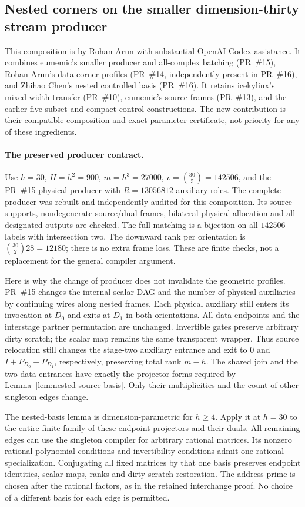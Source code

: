 \subsection{Nested corners on the smaller dimension-thirty stream producer}
\label{sec:stream-nested-composition}
This composition is by Rohan Arun with substantial OpenAI Codex assistance.
It combines eumemic's smaller producer and all-complex batching (PR~\#15),
Rohan Arun's data-corner profiles (PR~\#14, independently present in
PR~\#16), and Zhihao Chen's nested controlled basis (PR~\#16). It retains
icekylinx's mixed-width transfer (PR~\#10), eumemic's source frames
(PR~\#13), and the earlier five-subset and compact-control constructions.
The new contribution is their compatible composition and exact parameter
certificate, not priority for any of these ingredients.

\paragraph{The preserved producer contract.}
Use $h=30$, $H=h^2=900$, $m=h^3=27000$, $v=\binom{30}{5}=142506$,
and the PR~\#15 physical producer with $R=13056812$ auxiliary roles.
The complete producer was rebuilt and independently audited for this
composition. Its source supports, nondegenerate source/dual frames,
bilateral physical allocation and all designated outputs are checked.
The full matching is a bijection on all $142506$ labels with intersection
two. The downward rank per orientation is $\binom{30}{2}28=12180$;
there is no extra frame loss. These are finite checks, not a replacement
for the general compiler argument.

Here is why the change of producer does not invalidate the geometric
profiles. PR~\#15 changes the internal scalar DAG and the number of physical
auxiliaries by continuing wires along nested frames. Each physical
auxiliary still enters its invocation at $D_0$ and exits at $D_1$ in both
orientations. All data endpoints and the interstage partner permutation
are unchanged. Invertible gates preserve arbitrary dirty scratch; the
scalar map remains the same transparent wrapper. Thus source relocation
still changes the stage-two auxiliary entrance and exit to $0$ and
$I+P_{D_0}-P_{D_1}$, respectively, preserving total rank $m-h$.
The shared join and the two data entrances have exactly the projector
forms required by Lemma~\ref{lem:nested-source-basis}. Only their
multiplicities and the count of other singleton edges change.

The nested-basis lemma is dimension-parametric for $h\ge4$. Apply it
at $h=30$ to the entire finite family of these endpoint projectors and
their duals. All remaining edges can use the singleton compiler for
arbitrary rational matrices. Its nonzero rational polynomial conditions and
invertibility conditions admit one rational specialization. Conjugating
all fixed matrices by that one basis preserves endpoint identities,
scalar maps, ranks and dirty-scratch restoration. The address prime is
chosen after the rational factors, as in the retained interchange proof.
No choice of a different basis for each edge is permitted.

